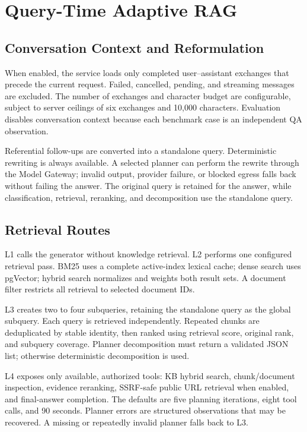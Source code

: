 

\section{Query-Time Adaptive RAG}

\subsection{Conversation Context and Reformulation}

When enabled, the service loads only completed user--assistant exchanges that
precede the current request. Failed, cancelled, pending, and streaming messages
are excluded. The number of exchanges and character budget are configurable,
subject to server ceilings of six exchanges and 10,000 characters.
Evaluation disables conversation context because each benchmark case is an
independent QA observation.

Referential follow-ups are converted into a standalone query. Deterministic
rewriting is always available. A selected planner can perform the rewrite
through the Model Gateway; invalid output, provider failure, or blocked egress
falls back without failing the answer. The original query is retained for the
answer, while classification, retrieval, reranking, and decomposition use the
standalone query.

\subsection{Retrieval Routes}

L1 calls the generator without knowledge retrieval. L2 performs one configured
retrieval pass. BM25 uses a complete active-index lexical cache; dense search
uses pgVector; hybrid search normalizes and weights both result sets. A
document filter restricts all retrieval to selected document IDs.

L3 creates two to four subqueries, retaining the standalone query as the global
subquery. Each query is retrieved independently. Repeated chunks are
deduplicated by stable identity, then ranked using retrieval score, original
rank, and subquery coverage. Planner decomposition must return a validated JSON
list; otherwise deterministic decomposition is used.

L4 exposes only available, authorized tools: KB hybrid search, chunk/document
inspection, evidence reranking, SSRF-safe public URL retrieval when enabled,
and final-answer completion. The defaults are five planning iterations, eight
tool calls, and 90 seconds. Planner errors are structured observations that may
be recovered. A missing or repeatedly invalid planner falls back to L3.

